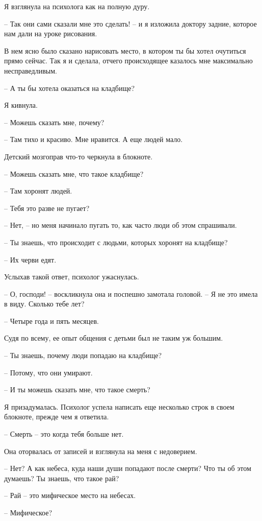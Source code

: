 \documentclass[
]{book}
\begin{document}
Я взглянула на психолога как на полную дуру.

-- Так они сами сказали мне это сделать! -- и я изложила доктору задние, которое нам дали на уроке рисования.

В нем ясно было сказано нарисовать место, в котором ты бы хотел очутиться прямо сейчас. Так я и сделала, отчего происходящее казалось мне максимально несправедливым.

-- А ты бы хотела оказаться на кладбище?

Я кивнула.

-- Можешь сказать мне, почему?

-- Там тихо и красиво. Мне нравится. А еще людей мало.

Детский мозгоправ что-то черкнула в блокноте.

-- Можешь сказать мне, что такое кладбище?

-- Там хоронят людей.

-- Тебя это разве не пугает?

-- Нет, -- но меня начинало пугать то, как часто люди об этом спрашивали.

-- Ты знаешь, что происходит с людьми, которых хоронят на кладбище?

-- Их черви едят.

Услыхав такой ответ, психолог ужаснулась.

-- О, господи! -- воскликнула она и поспешно замотала головой. -- Я не это имела в виду. Сколько тебе лет?

-- Четыре года и пять месяцев.

Судя по всему, ее опыт общения с детьми был не таким уж большим.

-- Ты знаешь, почему люди попадаю на кладбище?

-- Потому, что они умирают.

-- И ты можешь сказать мне, что такое смерть?

Я призадумалась. Психолог успела написать еще несколько строк в своем блокноте, прежде чем я ответила.

-- Смерть -- это когда тебя больше нет.

Она оторвалась от записей и взглянула на меня с недоверием.

-- Нет? А как небеса, куда наши души попадают после смерти? Что ты об этом думаешь? Ты знаешь, что такое рай?

-- Рай -- это мифическое место на небесах.

-- Мифическое?
\end{document}
